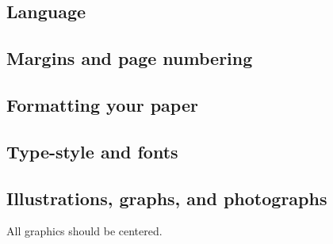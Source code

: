 \subsection{Language}

\subsection{Margins and page numbering}


\subsection{Formatting your paper}

\subsection{Type-style and fonts}


\subsection{Illustrations, graphs, and photographs}

All graphics should be centered.



%






